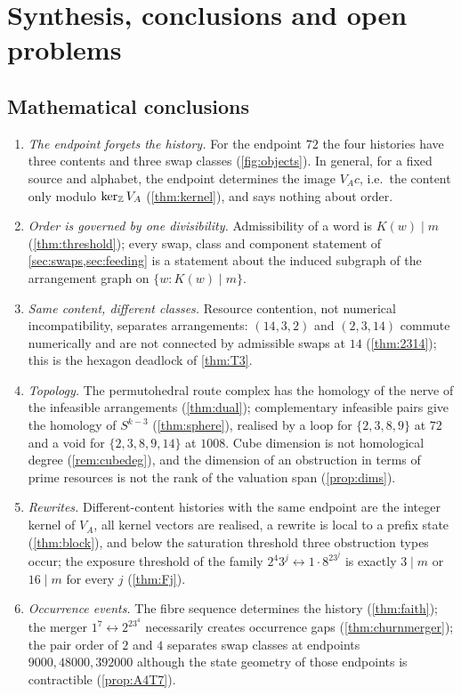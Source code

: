 \section{Synthesis, conclusions and open problems}\label{sec:synthesis}
\subsection{Mathematical conclusions}
\begin{enumerate}[leftmargin=2em,itemsep=2pt]
\item \emph{The endpoint forgets the history.} For the endpoint $72$ the four histories have three contents and three swap classes (\cref{fig:objects}). In general, for a fixed source and alphabet, the endpoint determines the image $V_Ac$, i.e.\ the content only modulo $\ker_{\mathbb Z}V_A$ (\cref{thm:kernel}), and says nothing about order.
\item \emph{Order is governed by one divisibility.} Admissibility of a word is $K(w)\mid m$ (\cref{thm:threshold}); every swap, class and component statement of \cref{sec:swaps,sec:feeding} is a statement about the induced subgraph of the arrangement graph on $\{w:K(w)\mid m\}$.
\item \emph{Same content, different classes.} Resource contention, not numerical incompatibility, separates arrangements: $(14,3,2)$ and $(2,3,14)$ commute numerically and are not connected by admissible swaps at $14$ (\cref{thm:2314}); this is the hexagon deadlock of \cref{thm:T3}.
\item \emph{Topology.} The permutohedral route complex has the homology of the nerve of the infeasible arrangements (\cref{thm:dual}); complementary infeasible pairs give the homology of $S^{k-3}$ (\cref{thm:sphere}), realised by a loop for $\{2,3,8,9\}$ at $72$ and a void for $\{2,3,8,9,14\}$ at $1008$. Cube dimension is not homological degree (\cref{rem:cubedeg}), and the dimension of an obstruction in terms of prime resources is not the rank of the valuation span (\cref{prop:dims}).
\item \emph{Rewrites.} Different-content histories with the same endpoint are the integer kernel of $V_A$, all kernel vectors are realised, a rewrite is local to a prefix state (\cref{thm:block}), and below the saturation threshold three obstruction types occur; the exposure threshold of the family $2^4 3^j\leftrightarrow1\cdot8^23^j$ is exactly $3\mid m$ or $16\mid m$ for every $j$ (\cref{thm:Fj}).
\item \emph{Occurrence events.} The fibre sequence determines the history (\cref{thm:faith}); the merger $1^7\leftrightarrow2^23^4$ necessarily creates occurrence gaps (\cref{thm:churnmerger}); the pair order of $2$ and $4$ separates swap classes at endpoints $9000,48000,392000$ although the state geometry of those endpoints is contractible (\cref{prop:A4T7}).
\end{enumerate}

